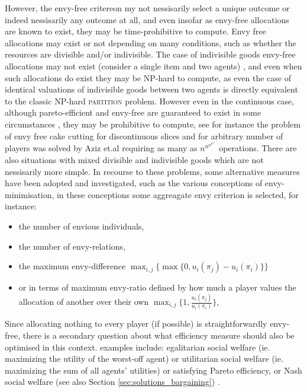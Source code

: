 However, the envy-free critereon my not nessisarily select a unique outcome or indeed nessisarily any outcome at all, and even insofar as envy-free allocations are known to exist, they may be time-prohibitive to compute.
Envy free allocations may exist or not depending on many conditions, such as whether the resources are divisible and/or indivisible. The case of indivisible goods envy-free allocations may not exist (consider a single item and two agents) \cite{DBLP:conf/aaai/ManurangsiS19}, and even when such allocations do exist they may be NP-hard to compute, as even the case of identical valuations of indivisible goods between two agents is directly equivalent to the classic NP-hard \textsc{partition} problem.\cite{NGUYEN201454}
However even in the continuous case, although pareto-efficient and envy-free are guaranteed to exist in some circumstances \cite{WELLER19855,COLE2021105207}, they may be prohibitive to compute, see for instance the problem of envy free cake cutting for discontinuous slices and for arbitrary number of players was solved by Aziz et.al \cite{DBLP:conf/focs/AzizM16} requiring as many as $n^{n^{n^{n^{n^n}}}}$ operations.
There are also situations with mixed divisible and indivisible goods which are not nessisarily more simple.\cite{BEI2021103436}
In recourse to these problems, some alternative measures have been adopted and investigated, such as the various conceptions of envy-minimisation,
in these conceptions some aggreagate envy criterion is selected, for instance: 
\begin{itemize}
\item the number of envious individuals, 
\item the number of envy-relations, 
\item the maximum envy-difference $\max_{i,j}\{\max\{0,u_i(\pi_j)-u_i(\pi_i)\}\}$ \cite{10.1145/3219166.3219179,10.1145/988772.988792}
\item or in terms of maximum envy-ratio defined by how much a player values the allocation of another over their own $\max_{i,j}\{1,\frac{u_i(\pi_j)}{u_i(\pi_i)}\}$, \cite{NGUYEN201454}
\end{itemize}
Since allocating nothing to every player (if possible) is straightforwardly envy-free, there is a secondary question about what efficiency measure should also be optimised in this context.
examples include: egalitarian social welfare (ie. maximizing the utility of the worst-off agent) or utilitarian social welfare (ie. maximizing the sum of all agents' utilities) or satisfying Pareto efficiency, or Nash social welfare (see also Section \ref{sec:solutions_bargaining}) \cite{NGUYEN201454}.

